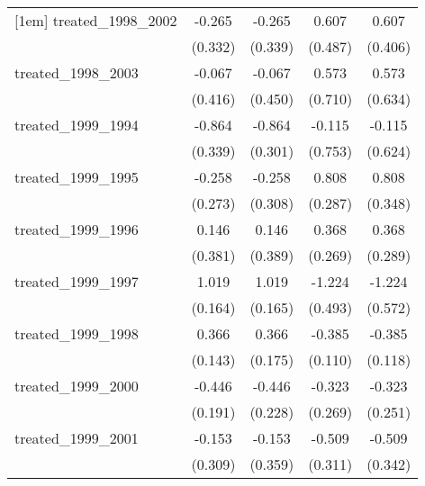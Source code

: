 {\begin{tabular}{l*{4}{c}}
[1em]
treated\_1998\_2002&      -0.265         &      -0.265         &       0.607         &       0.607         \\
            &     (0.332)         &     (0.339)         &     (0.487)         &     (0.406)         \\
[1em]
treated\_1998\_2003&      -0.067         &      -0.067         &       0.573         &       0.573         \\
            &     (0.416)         &     (0.450)         &     (0.710)         &     (0.634)         \\
[1em]
treated\_1999\_1994&      -0.864\sym{*}  &      -0.864\sym{**} &      -0.115         &      -0.115         \\
            &     (0.339)         &     (0.301)         &     (0.753)         &     (0.624)         \\
[1em]
treated\_1999\_1995&      -0.258         &      -0.258         &       0.808\sym{**} &       0.808\sym{*}  \\
            &     (0.273)         &     (0.308)         &     (0.287)         &     (0.348)         \\
[1em]
treated\_1999\_1996&       0.146         &       0.146         &       0.368         &       0.368         \\
            &     (0.381)         &     (0.389)         &     (0.269)         &     (0.289)         \\
[1em]
treated\_1999\_1997&       1.019\sym{***}&       1.019\sym{***}&      -1.224\sym{*}  &      -1.224\sym{*}  \\
            &     (0.164)         &     (0.165)         &     (0.493)         &     (0.572)         \\
[1em]
treated\_1999\_1998&       0.366\sym{*}  &       0.366\sym{*}  &      -0.385\sym{***}&      -0.385\sym{**} \\
            &     (0.143)         &     (0.175)         &     (0.110)         &     (0.118)         \\
[1em]
treated\_1999\_2000&      -0.446\sym{*}  &      -0.446         &      -0.323         &      -0.323         \\
            &     (0.191)         &     (0.228)         &     (0.269)         &     (0.251)         \\
[1em]
treated\_1999\_2001&      -0.153         &      -0.153         &      -0.509         &      -0.509         \\
            &     (0.309)         &     (0.359)         &     (0.311)         &     (0.342)         \\

\end{tabular}}
